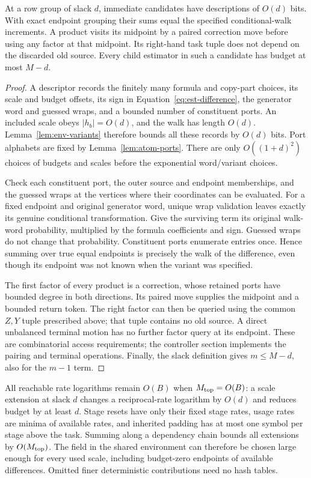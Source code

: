 \begin{lemma}\label{lem:est-paths}
At a row group of slack $d$, immediate candidates have descriptions of
$O(d)$ bits.  With exact endpoint grouping their sums equal the specified
conditional-walk increments.  A product visits its midpoint by a paired
correction move before using any factor at that midpoint.  Its right-hand
task tuple does not depend on the discarded old source.  Every child
estimator in such a candidate has budget at most $M-d$.
\end{lemma}
\begin{proof}
A descriptor records the finitely many formula and copy-part choices, its
scale and budget offsets, its sign in Equation~\eqref{eq:est-difference},
the generator word and guessed wraps, and a bounded number of constituent
ports.  An included scale obeys $|h_b|=O(d)$, and the walk has length
$O(d)$.  Lemma~\ref{lem:env-variants} therefore bounds all these records by
$O(d)$ bits.  Port alphabets are fixed by Lemma~\ref{lem:atom-ports}.
There are only $O((1+d)^2)$ choices of budgets and scales before the
exponential word/variant choices.

Check each constituent port, the outer source and endpoint memberships,
and the guessed wraps at the vertices where their coordinates can be
evaluated.  For a fixed endpoint and original generator word, unique wrap
validation leaves exactly its genuine conditional transformation.
Give the surviving term its original walk-word probability, multiplied
by the formula coefficients and sign.  Guessed wraps do not change that
probability.  Constituent ports enumerate entries once.  Hence summing
over true equal endpoints is precisely the walk of the difference, even
though its endpoint was not known when the variant was specified.

The first factor of every product is a correction, whose retained ports
have bounded degree in both directions.  Its paired move supplies the
midpoint and a bounded return token.  The right factor can then be queried
using the common $Z,Y$ tuple prescribed above; that tuple contains no old
source.  A direct unbalanced terminal motion has no further factor query
at its endpoint.  These are combinatorial access requirements; the
controller section implements the pairing and terminal operations.
Finally, the slack definition gives $m\le M-d$, also for the $m-1$ term.
\end{proof}


All reachable rate logarithms remain $O(B)$ when $M_{\rm top}=O(B)$:
a scale extension at slack $d$ changes a reciprocal-rate logarithm by
$O(d)$ and reduces budget by at least $d$.  Stage resets have only their
fixed stage rates, usage rates are minima of available rates, and inherited
padding has at most one symbol per stage above the task.  Summing along a
dependency chain bounds all extensions by $O(M_{\rm top})$.  The field in
the shared environment can therefore be chosen large enough for every
used scale, including budget-zero endpoints of available differences.
Omitted finer deterministic contributions need no hash tables.


